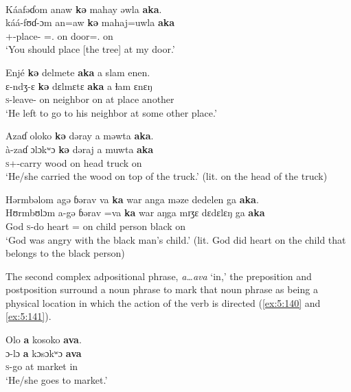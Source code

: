 \ea \label{ex:5:136}\\
Káafəɗom  anaw  \textbf{kə} mahay  əwla \textbf{aka}.\\
\gll  káá-fʊɗ-ɔm    an=aw    \textbf{kə} mahaj=uwla \textbf{aka}\\
      +{\POT}-place-{\twoP}  {\DAT}={\oneS}.{\IO}  on  door={\oneS}.{\POSS}  on\\
\glt  ‘You should place  [the tree] at my door.’  
\z

\ea \label{ex:5:137}
Enjé  \textbf{kə} delmete  \textbf{aka} a  slam  enen.\\
\gll  ɛ{}-ndʒ{}-ɛ    \textbf{kə} dɛlmɛtɛ \textbf{aka} a  ɬam  ɛnɛŋ\\
      \textsc{s}-leave-{\CL}    on  neighbor    on  at  place  another\\
\glt  ‘He left to go to his neighbor at some other place.’  
\z

\ea \label{ex:5:138}
Azaɗ  oloko  \textbf{kə}  dəray  a  məwta  \textbf{aka}.\\
\gll  à-zaɗ    ɔlɔkʷɔ  \textbf{kə}  dəraj  a  muwta  \textbf{aka}\\
      \textsc{s}+{\PFV}-carry  wood  on  head  {\GEN}  truck  on\\
\glt  ‘He/she carried the wood on top of the truck.’ (lit. on the head of the truck)
\z

\ea \label{ex:5:139}
Hərmbəlom  agə  ɓərav  va  \textbf{ka} war  anga  məze  dedelen  ga \textbf{aka}.\\
\gll  Hʊrmbʊlɔm  a-gə  ɓərav  =va  \textbf{ka} war  aŋga  mɪʒɛ  dɛdɛlɛŋ  ga \textbf{aka}\\
      God    \textsc{s}-do  heart  ={\PRF}  on  child  {\POSS}  person  black  {\ADJ}  on\\
\glt  ‘God was angry with the black man’s child.’  (lit. God did heart on the child that belongs to the black person)
\z

The second complex adpositional phrase, \textit{a…ava} ‘in,’ the preposition and postposition surround a noun phrase to mark that noun phrase as being a physical location in which the action of the verb is directed (\ref{ex:5:140} and \ref{ex:5:141}).

\ea \label{ex:5:140}
Olo  \textbf{a}  kosoko  \textbf{ava}.\\
\gll  ɔ{}-lɔ    \textbf{a}  kɔsɔkʷɔ  \textbf{ava}\\
      \textsc{s}-go  at  market  in\\
\glt  ‘He/she goes to market.’
\z

